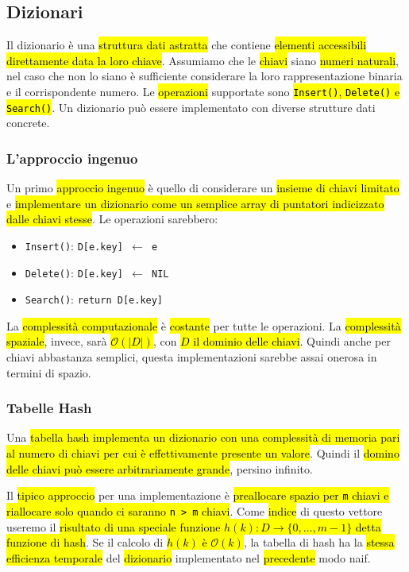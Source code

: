 \documentclass[a4paper,11pt,oneside]{article}
\theoremstyle{plain}
\theoremstyle{definition}
\theoremstyle{remark}
\newcommand{\peq}{$\gets$}
\begin{document}
\subsection{Dizionari}\label{sec:dictionary}

Il dizionario è una \hl{struttura dati astratta} che contiene \hl{elementi
accessibili direttamente data la loro chiave}. Assumiamo che le \hl{chiavi}
siano \hl{numeri naturali}, nel caso che non lo siano è sufficiente considerare
la loro rappresentazione binaria e il corrispondente numero. Le \hl{operazioni}
supportate sono \hl{\texttt{Insert()}, \texttt{Delete()} e \texttt{Search()}}.
Un dizionario può essere implementato con diverse strutture dati concrete.

\subsubsection{L'approccio ingenuo}\label{sec:dictionary-key-array}

Un primo \hl{approccio ingenuo} è quello di considerare un \hl{insieme di chiavi limitato}
e \hl{implementare un dizionario come un semplice array di puntatori indicizzato
dalle chiavi stesse}. Le operazioni sarebbero:

\begin{itemize}
  \item \texttt{Insert()}: \texttt{D[e.key] \peq{} e}
  \item \texttt{Delete()}: \texttt{D[e.key] \peq{} NIL}
  \item \texttt{Search()}: \texttt{return D[e.key]}
\end{itemize}

La \hl{complessità computazionale} è \hl{costante} per tutte le operazioni. La
\hl{complessità spaziale}, invece, sarà \hl{$\mathcal{O}(|D|)$}, con \hl{$D$ il
dominio delle chiavi}. Quindi anche per chiavi abbastanza semplici, questa
implementazioni sarebbe assai onerosa in termini di spazio.

\subsubsection{Tabelle Hash}\label{sec:hash-tables}

Una \hl{tabella hash implementa un dizionario con una complessità di memoria
pari al numero di chiavi per cui è effettivamente presente un valore}. Quindi il
\hl{domino delle chiavi può essere arbitrariamente grande}, persino infinito.

Il \hl{tipico approccio} per una implementazione è \hl{preallocare spazio per
\texttt{m} chiavi e riallocare solo quando ci saranno \texttt{n > m} chiavi}.
Come \hl{indice} di questo vettore useremo il \hl{risultato di una speciale
funzione $h(k): D \to \{0, \ldots, m-1\}$ detta funzione di hash}. Se il calcolo
di \hl{$h(k)$ è $\mathcal{O}(k)$}, la tabella di hash ha la \hl{stessa
efficienza temporale} del \hl{dizionario} implementato nel \hl{precedente} modo
naif.
\end{document}
